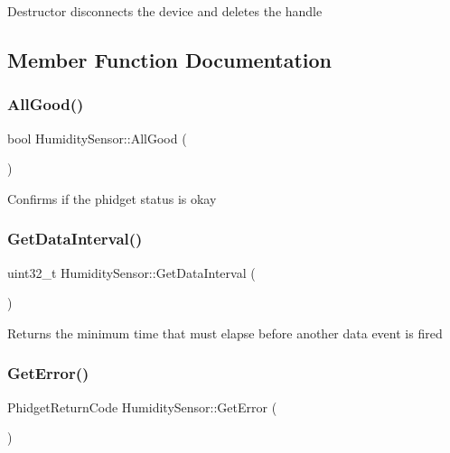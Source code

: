 Destructor disconnects the device and deletes the handle

\subsection{Member Function Documentation}
\mbox{\label{classHumiditySensor_a5ac9e8fc8d6fc1e78463ce8a7ceae54e}} 
\subsubsection{\texorpdfstring{All\+Good()}{AllGood()}}
{\footnotesize\ttfamily bool Humidity\+Sensor\+::\+All\+Good (\begin{DoxyParamCaption}{ }\end{DoxyParamCaption})\hspace{0.3cm}{\ttfamily [inline]}}

Confirms if the phidget status is okay\mbox{\label{classHumiditySensor_a19dce556c56c771849e4f62398a4bb1f}} 
\subsubsection{\texorpdfstring{Get\+Data\+Interval()}{GetDataInterval()}}
{\footnotesize\ttfamily uint32\+\_\+t Humidity\+Sensor\+::\+Get\+Data\+Interval (\begin{DoxyParamCaption}{ }\end{DoxyParamCaption})\hspace{0.3cm}{\ttfamily [inline]}}

Returns the minimum time that must elapse before another data event is fired\mbox{\label{classHumiditySensor_aa425c22d068e39da7df26f473499dd37}} 
\subsubsection{\texorpdfstring{Get\+Error()}{GetError()}}
{\footnotesize\ttfamily Phidget\+Return\+Code Humidity\+Sensor\+::\+Get\+Error (\begin{DoxyParamCaption}{ }\end{DoxyParamCaption})\hspace{0.3cm}{\ttfamily [inline]}}

